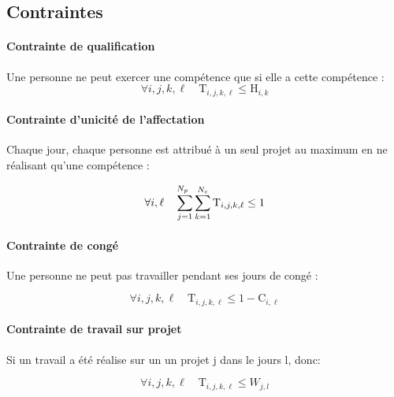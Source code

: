\documentclass[12pt, a4paper, french, version=last, parskip=half, titlepage]{scrartcl}
\begin{document}
\subsection{Contraintes}
\label{sec:constraints}

\paragraph{Contrainte de qualification}
Une personne ne peut exercer une compétence que si elle a cette compétence :
\begin{equation*}
    \forall i, j, k, \ell \quad \text{T}_{i, j, k, \ell} \leq \text{H}_{i, k}
\end{equation*}

\paragraph{Contrainte d’unicité de l’affectation}
Chaque jour, chaque personne est attribué à un seul projet au maximum en ne réalisant qu'une compétence :

\begin{equation*}
    \forall i, \ell \quad \sum_{j=1}^{\mathclap{N_p} \hspace{1ex}}\sum_{k=1}^{\mathclap{N_c}} \text{T}_{i, j, k, \ell} \leq 1
\end{equation*}

\paragraph{Contrainte de congé}
Une personne ne peut pas travailler pendant ses jours de congé :

\begin{equation*}
    \forall i, j, k, \ell \quad \text{T}_{i,j,k,\ell} \le 1 - \text{C}_{i,\ell}
\end{equation*}

\paragraph{Contrainte de travail sur projet}

Si un travail a été réalise sur un un projet j dans le jours l, donc:

\begin{equation*}
    \forall i, j, k, \ell \quad \text{T}_{i, j, k, \ell} \leq W_{j, l}
\end{equation*}



\end{document}
